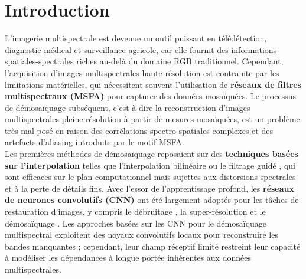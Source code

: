 \documentclass[conference]{IEEEtran}
\begin{document}
\section{Introduction}
L'imagerie multispectrale est devenue un outil puissant en télédétection, diagnostic médical et surveillance agricole, car elle fournit des informations spatiales-spectrales riches au-delà du domaine RGB traditionnel. Cependant, l'acquisition d'images multispectrales haute résolution est contrainte par les limitations matérielles, qui nécessitent souvent l'utilisation de \textbf{réseaux de filtres multispectraux (MSFA)} pour capturer des données mosaïquées. Le processus de démosaïquage subséquent, c'est-à-dire la reconstruction d'images multispectrales pleine résolution à partir de mesures mosaïquées, est un problème très mal posé en raison des corrélations spectro-spatiales complexes et des artefacts d'aliasing introduits par le motif MSFA. \\

Les premières méthodes de démosaïquage reposaient sur des \textbf{techniques basées sur l'interpolation} telles que l'interpolation bilinéaire ou le filtrage guidé \cite{article}, qui sont efficaces sur le plan computationnel mais sujettes aux distorsions spectrales et à la perte de détails fins. Avec l'essor de l'apprentissage profond, les \textbf{réseaux de neurones convolutifs (CNN)} ont été largement adoptés pour les tâches de restauration d'images, y compris le débruitage \cite{Zhang2017}, la super-résolution \cite{Dong2016} et le démosaïquage \cite{Monno2012}. Les approches basées sur les CNN pour le démosaïquage multispectral exploitent des noyaux convolutifs locaux pour reconstruire les bandes manquantes ; cependant, leur champ réceptif limité restreint leur capacité à modéliser les dépendances à longue portée inhérentes aux données multispectrales. \\
\end{document}
